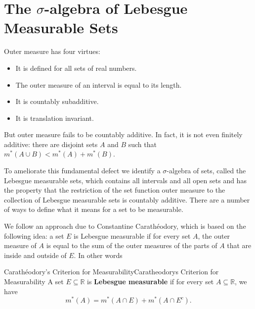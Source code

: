 \documentclass[../main.tex]{subfiles}
\begin{document}
\section{The $\sigma$-algebra of Lebesgue Measurable Sets}
Outer measure has four virtues:
\begin{itemize}
  \item It is defined for all sets of real numbers.
  \item The outer measure of an interval is equal to its length.
  \item It is countably subadditive.
  \item It is translation invariant.
\end{itemize}
But outer measure fails to be countably additive. In fact, it is not even finitely additive: there are disjoint sets $A$ and $B$ such that $m^*(A \cup B) < m^*(A) + m^*(B)$.

To ameliorate this fundamental defect we identify a $\sigma$-algebra of sets, called the Lebesgue measurable sets, which contains all intervals and all open sets and has the property that the restriction of the set function outer measure to the collection of Lebesgue measurable sets is countably additive. There are a number of ways to define what it means for a set to be measurable.

We follow an approach due to Constantine Carath\'eodory, which is based on the following idea: a set $E$ is Lebesgue measurable if for every set $A$, the outer measure of $A$ is equal to the sum of the outer measures of the parts of $A$ that are inside and outside of $E$. In other words
\begin{definition}{Carath\'eodory's Criterion for Measurability}{Caratheodorys Criterion for Measurability}
  A set $E \subseteq \mathbb{R}$ is \textbf{Lebesgue measurable} if for every set $A \subseteq \mathbb{R}$, we have
  \begin{equation}
    m^*(A) = m^*(A \cap E) + m^*(A \cap E^c).
  \end{equation}
\end{definition}
\end{document}
